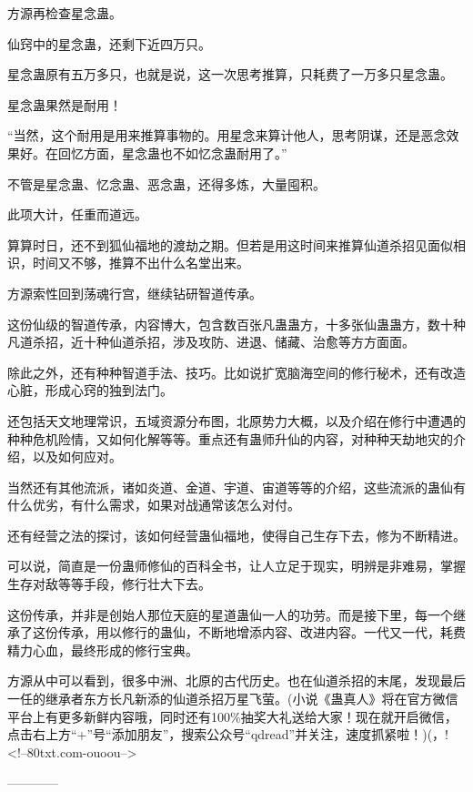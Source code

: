 \begin{this_body}
方源再检查星念蛊。

仙窍中的星念蛊，还剩下近四万只。

星念蛊原有五万多只，也就是说，这一次思考推算，只耗费了一万多只星念蛊。

星念蛊果然是耐用！

“当然，这个耐用是用来推算事物的。用星念来算计他人，思考阴谋，还是恶念效果好。在回忆方面，星念蛊也不如忆念蛊耐用了。”

不管是星念蛊、忆念蛊、恶念蛊，还得多炼，大量囤积。

此项大计，任重而道远。

算算时日，还不到狐仙福地的渡劫之期。但若是用这时间来推算仙道杀招见面似相识，时间又不够，推算不出什么名堂出来。

方源索性回到荡魂行宫，继续钻研智道传承。

这份仙级的智道传承，内容博大，包含数百张凡蛊蛊方，十多张仙蛊蛊方，数十种凡道杀招，近十种仙道杀招，涉及攻防、进退、储藏、治愈等方方面面。

除此之外，还有种种智道手法、技巧。比如说扩宽脑海空间的修行秘术，还有改造心脏，形成心窍的独到法门。

还包括天文地理常识，五域资源分布图，北原势力大概，以及介绍在修行中遭遇的种种危机险情，又如何化解等等。重点还有蛊师升仙的内容，对种种天劫地灾的介绍，以及如何应对。

当然还有其他流派，诸如炎道、金道、宇道、宙道等等的介绍，这些流派的蛊仙有什么优劣，有什么需求，如果对战通常该怎么对付。

还有经营之法的探讨，该如何经营蛊仙福地，使得自己生存下去，修为不断精进。

可以说，简直是一份蛊师修仙的百科全书，让人立足于现实，明辨是非难易，掌握生存对敌等等手段，修行壮大下去。

这份传承，并非是创始人那位天庭的星道蛊仙一人的功劳。而是接下里，每一个继承了这份传承，用以修行的蛊仙，不断地增添内容、改进内容。一代又一代，耗费精力心血，最终形成的修行宝典。

方源从中可以看到，很多中洲、北原的古代历史。也在仙道杀招的末尾，发现最后一任的继承者东方长凡新添的仙道杀招万星飞萤。(小说《蛊真人》将在官方微信平台上有更多新鲜内容哦，同时还有100\%抽奖大礼送给大家！现在就开启微信，点击右上方“+”号“添加朋友”，搜索公众号“qdread”并关注，速度抓紧啦！)(，!<!--80txt.com-ouoou-->

------------

\end{this_body}

